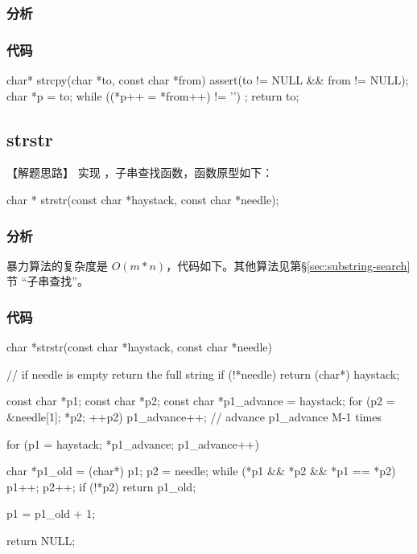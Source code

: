 \subsubsection{分析}



\subsubsection{代码}
\begin{Code}
char* strcpy(char *to, const char *from) {
    assert(to != NULL && from != NULL);
    char *p = to;
    while ((*p++ = *from++) != '\0')
        ;
    return to;
}
\end{Code}


\subsection{strstr}


【解题思路】
实现 ，子串查找函数，函数原型如下：
\begin{Code}
char * strstr(const char *haystack, const char *needle);
\end{Code}


\subsubsection{分析}
暴力算法的复杂度是 $O(m*n)$，代码如下。其他算法见第\S \ref{sec:substring-search}节 
“子串查找”。


\subsubsection{代码}
\begin{Code}
char *strstr(const char *haystack, const char *needle) {
    // if needle is empty return the full string
    if (!*needle) return (char*) haystack;

    const char *p1;
    const char *p2;
    const char *p1_advance = haystack;
    for (p2 = &needle[1]; *p2; ++p2) {
        p1_advance++;   // advance p1_advance M-1 times
    }

    for (p1 = haystack; *p1_advance; p1_advance++) {
        char *p1_old = (char*) p1;
        p2 = needle;
        while (*p1 && *p2 && *p1 == *p2) {
            p1++;
            p2++;
        }
        if (!*p2) return p1_old;

        p1 = p1_old + 1;
    }
    return NULL;
}
\end{Code}


